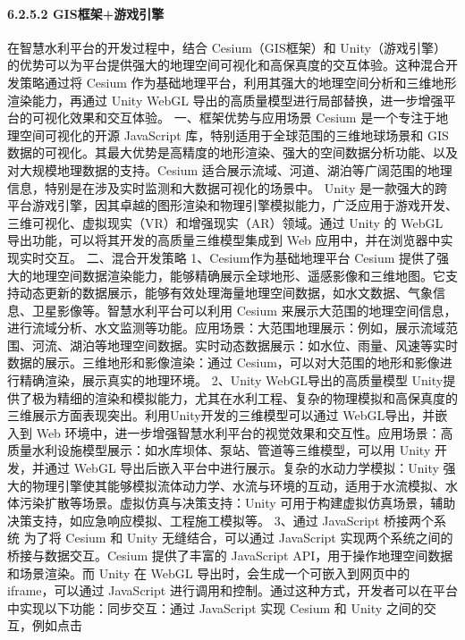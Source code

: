 {\paragraph{6.2.5.2 GIS框架+游戏引擎}\label{gisux6846ux67b6ux6e38ux620fux5f15ux64ce} 在智慧水利平台的开发过程中，结合 Cesium（GIS框架）和
Unity（游戏引擎）的优势可以为平台提供强大的地理空间可视化和高保真度的交互体验。这种混合开发策略通过将 Cesium 作为基础地理平台，利用其强大的地理空间分析和三维地形渲染能力，再通过 Unity WebGL
导出的高质量模型进行局部替换，进一步增强平台的可视化效果和交互体验。 一、框架优势与应用场景 Cesium 是一个专注于地理空间可视化的开源 JavaScript 库，特别适用于全球范围的三维地球场景和 GIS
数据的可视化。其最大优势是高精度的地形渲染、强大的空间数据分析功能、以及对大规模地理数据的支持。Cesium 适合展示流域、河道、湖泊等广阔范围的地理信息，特别是在涉及实时监测和大数据可视化的场景中。 Unity
是一款强大的跨平台游戏引擎，因其卓越的图形渲染和物理引擎模拟能力，广泛应用于游戏开发、三维可视化、虚拟现实（VR）和增强现实（AR）领域。通过 Unity 的 WebGL 导出功能，可以将其开发的高质量三维模型集成到 Web
应用中，并在浏览器中实现实时交互。 二、混合开发策略 1、Cesium作为基础地理平台 Cesium
提供了强大的地理空间数据渲染能力，能够精确展示全球地形、遥感影像和三维地图。它支持动态更新的数据展示，能够有效处理海量地理空间数据，如水文数据、气象信息、卫星影像等。智慧水利平台可以利用 Cesium
来展示大范围的地理空间信息，进行流域分析、水文监测等功能。应用场景：大范围地理展示：例如，展示流域范围、河流、湖泊等地理空间数据。实时动态数据展示：如水位、雨量、风速等实时数据的展示。三维地形和影像渲染：通过
Cesium，可以对大范围的地形和影像进行精确渲染，展示真实的地理环境。 2、Unity WebGL导出的高质量模型
Unity提供了极为精细的渲染和模拟能力，尤其在水利工程、复杂的物理模拟和高保真度的三维展示方面表现突出。利用Unity开发的三维模型可以通过 WebGL导出，并嵌入到 Web
环境中，进一步增强智慧水利平台的视觉效果和交互性。应用场景：高质量水利设施模型展示：如水库坝体、泵站、管道等三维模型，可以用 Unity 开发，并通过 WebGL 导出后嵌入平台中进行展示。复杂的水动力学模拟：Unity
强大的物理引擎使其能够模拟流体动力学、水流与环境的互动，适用于水流模拟、水体污染扩散等场景。虚拟仿真与决策支持：Unity 可用于构建虚拟仿真场景，辅助决策支持，如应急响应模拟、工程施工模拟等。 3、通过 JavaScript 桥接两个系统
为了将 Cesium 和 Unity 无缝结合，可以通过 JavaScript 实现两个系统之间的桥接与数据交互。Cesium 提供了丰富的 JavaScript API，用于操作地理空间数据和场景渲染。而 Unity 在 WebGL
导出时，会生成一个可嵌入到网页中的 iframe，可以通过 JavaScript 进行调用和控制。通过这种方式，开发者可以在平台中实现以下功能：同步交互：通过 JavaScript 实现 Cesium 和 Unity 之间的交互，例如点击
}
